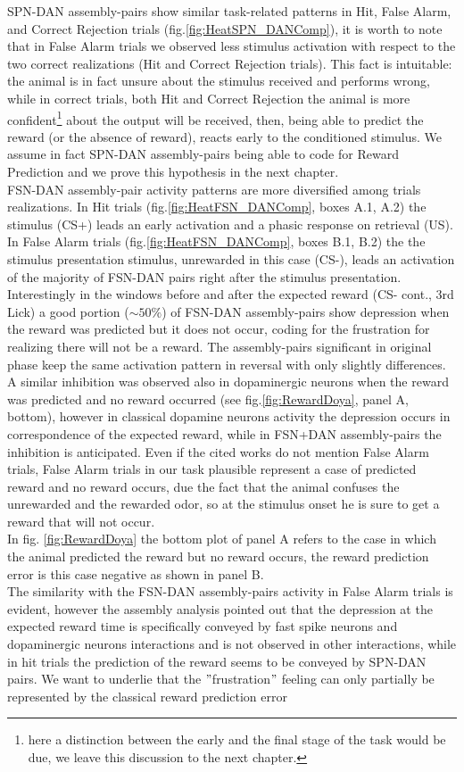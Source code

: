 SPN-DAN assembly-pairs show similar task-related patterns in Hit, False Alarm, and Correct Rejection trials (fig.\ref{fig:HeatSPN_DANComp}), it is worth to note that in False Alarm trials we observed less stimulus activation with respect to the two correct realizations (Hit and Correct Rejection trials). This fact is intuitable: the animal is in fact unsure about the stimulus received and performs wrong, while in correct trials, both Hit and Correct Rejection the animal is more confident\footnote{here a distinction between the early and the final stage of the task would be due, we leave this discussion to the next chapter.} about the output will be received, then, being able to predict the reward (or the absence of reward), reacts early to the conditioned stimulus. We assume in fact SPN-DAN assembly-pairs being able to code for Reward Prediction and we prove this hypothesis in the next chapter.\\FSN-DAN assembly-pair activity patterns are more diversified among trials realizations. In Hit trials (fig.\ref{fig:HeatFSN_DANComp}, boxes A.1, A.2) the stimulus (CS+) leads an early activation and a phasic response on retrieval (US). In False Alarm trials (fig.\ref{fig:HeatFSN_DANComp}, boxes B.1, B.2) the the stimulus presentation stimulus, unrewarded in this case (CS-), leads an activation of the majority of FSN-DAN pairs right after the stimulus presentation. Interestingly in the windows before and after the expected reward (CS- cont., 3rd Lick) a good portion ($\sim50\%$) of FSN-DAN assembly-pairs show depression when the reward was predicted but it does not occur, coding for the frustration for realizing there will not be a reward. The assembly-pairs significant in original phase keep the same activation pattern in reversal with only slightly differences.\\A similar inhibition was observed also in dopaminergic neurons when the reward was predicted and no reward occurred (see fig.\ref{fig:RewardDoya}, panel A, bottom), however in classical dopamine neurons activity the depression occurs in correspondence of the expected reward, while in FSN+DAN assembly-pairs the inhibition is anticipated. Even if the cited works do not mention False Alarm trials, False Alarm trials in our task plausible represent a case of predicted reward and no reward occurs, due the fact that the animal confuses the unrewarded and the rewarded odor, so at the stimulus onset he is sure to get a reward that will not occur.\\In fig. \ref{fig:RewardDoya} the bottom plot of panel A refers to the case in which the animal predicted the reward but no reward occurs, the reward prediction error is this case negative as shown in panel B.\\The similarity with the FSN-DAN assembly-pairs activity in False Alarm trials is evident, however the assembly analysis pointed out that the depression at the expected reward time is specifically conveyed by fast spike neurons and dopaminergic neurons interactions and is not observed in other interactions, while in hit trials the prediction of the reward seems to be conveyed by SPN-DAN pairs. We want to underlie that the $"$frustration$"$ feeling can only partially be represented by the classical reward prediction error 